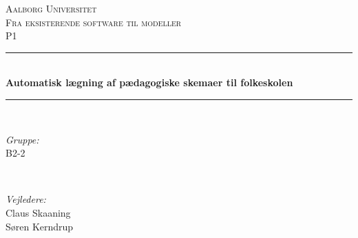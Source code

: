 \begin{titlepage}

\newcommand{\HRule}{\rule{\linewidth}{0.5mm}} %

\center %
 

\textsc{\LARGE Aalborg Universitet}\\[1.5cm] %
\textsc{\Large Fra eksisterende software til modeller}\\[0.5cm] %
\textsc{\large P1}\\[0.5cm] %


\HRule \\[0.4cm]
{ \huge \bfseries Automatisk lægning af pædagogiske skemaer til folkeskolen}\\[0.4cm] %
\HRule \\[1.5cm]
 

\begin{minipage}{0.4\textwidth}
\begin{flushleft} \large
\emph{Gruppe:}\\
B2-2 %
\end{flushleft}
\end{minipage}
~
\begin{minipage}{0.4\textwidth}
\begin{flushright} \large
\emph{Vejledere:} \\
Claus Skaaning\\Søren Kerndrup %
\end{flushright}
\end{minipage}\\[4cm]



\end{titlepage}
